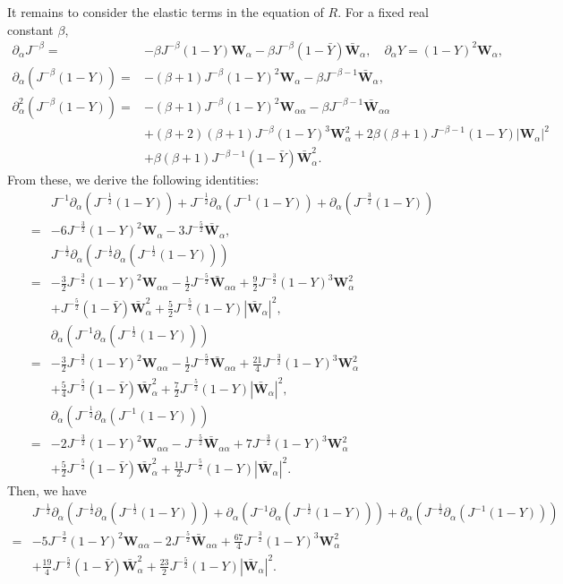 \documentclass[10pt]{amsart}
\theoremstyle{remark}
\theoremstyle{definition}
\numberwithin{equation}{section}
\newcommand{\p}{\partial}
\newcommand{\al}{\alpha}
\newcommand{\f}{\frac}
\newcommand{\bw}{\mathbf{W}}
\begin{document}
It remains to consider the elastic terms in the equation of $R$.
For a fixed real constant $\beta$,
\begin{align*}
\p_{\al}J^{-\beta}
=&-\beta J^{-\beta}(1-Y)\bw_{\al}-\beta J^{-\beta}(1-\bar{Y})\bar{\bw}_{\al},\quad \p_{\al}Y=(1-Y)^2\bw_{\al},\\
\p_{\al}(J^{-\beta}(1-Y))
=&-(\beta+1)J^{-\beta}(1-Y)^2\bw_{\al}-\beta J^{-\beta-1}
\bar{\bw}_{\al},\\
\p^2_{\al}(J^{-\beta}(1-Y))
=&-(\beta+1)J^{-\beta}(1-Y)^2\bw_{\al\al}-\beta J^{-\beta-1}
\bar{\bw}_{\al\al}\\
&+(\beta+2)(\beta+1)J^{-\beta}(1-Y)^3\bw_{\al}^2+2\beta(\beta+1)J^{-\beta-1}(1-Y)|\bw_{\al}|^2\\
&+\beta(\beta+1)J^{-\beta-1}(1-\bar{Y})\bar{\bw}_{\al}^2.
\end{align*}
From these, we derive the following identities:
\begin{align*}
&J^{-1}\p_{\al}(J^{-\f12}(1-Y))+J^{-\f12}\p_{\al}(J^{-1}(1-Y))+\p_{\al}(J^{-\f32}(1-Y))\\ =&-6J^{-\f32}(1-Y)^2\bw_{\al} -3J^{-\f52}
\bar{\bw}_{\al}, \\
&J^{-\f12}\p_{\al}\left(J^{-\f12}\p_{\al}\left(J^{-\f12}(1-Y)\right)\right)\\
=&-\f32 J^{-\f32}(1-Y)^2\bw_{\al\al}-\f12 J^{-\f52}
\bar{\bw}_{\al\al}+\f{9}{2}J^{-\f32}(1-Y)^3\bw_{\al}^2\\
&+J^{-\f52}(1-\bar{Y})\bar{\bw}_{\al}^2
+\f52J^{-\f52}(1-Y)|\bar{\bw}_{\al}|^2,\\
&\p_{\al}(J^{-1}\p_{\al}(J^{-\f12}(1-Y)))\\
=&-\f32 J^{-\f32}(1-Y)^2\bw_{\al\al}-\f12 J^{-\f52}
\bar{\bw}_{\al\al}+\f{21}{4}J^{-\f32}(1-Y)^3\bw_{\al}^2\\
&+\f54J^{-\f52}(1-\bar{Y})\bar{\bw}_{\al}^2
+\f{7}{2}J^{-\f52}(1-Y)|\bar{\bw}_{\al}|^2,\\
&\p_{\al}(J^{-\f12}\p_{\al}(J^{-1}(1-Y)))\\
=&-2 J^{-\f32}(1-Y)^2\bw_{\al\al}- J^{-\f52}
\bar{\bw}_{\al\al}+7J^{-\f32}(1-Y)^3\bw_{\al}^2\\
&+\f52J^{-\f52}(1-\bar{Y})\bar{\bw}_{\al}^2
+\f{11}{2}J^{-\f52}(1-Y)|\bar{\bw}_{\al}|^2.
\end{align*}
Then, we have
\begin{align*}
&J^{-\f12}\p_{\al}(J^{-\f12}\p_{\al}(J^{-\f12}(1-Y)))+\p_{\al}(J^{-1}\p_{\al}(J^{-\f12}(1-Y)))+\p_{\al}(J^{-\f12}\p_{\al}(J^{-1}(1-Y)))\\ 
=&-5J^{-\f32}(1-Y)^2\bw_{\al\al}-2 J^{-\f52}
\bar{\bw}_{\al\al}+\f{67}{4}J^{-\f32}(1-Y)^3\bw_{\al}^2\\
&+\f{19}{4}J^{-\f52}(1-\bar{Y})\bar{\bw}_{\al}^2
+\f{23}{2}J^{-\f52}(1-Y)|\bar{\bw}_{\al}|^2.
\end{align*}
\end{document}
